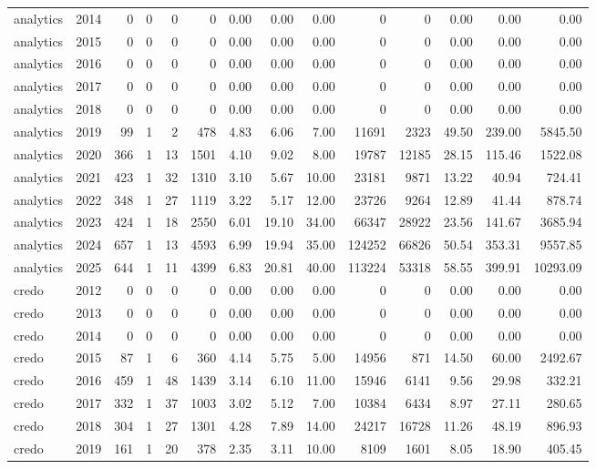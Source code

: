 \begin{table}[htbp]
\begin{tabular}{lrrrrrrrrrrrrr}
analytics & 2014 & 0 & 0 & 0 & 0 & 0.00 & 0.00 & 0.00 & 0 & 0 & 0.00 & 0.00 & 0.00 \\
analytics & 2015 & 0 & 0 & 0 & 0 & 0.00 & 0.00 & 0.00 & 0 & 0 & 0.00 & 0.00 & 0.00 \\
analytics & 2016 & 0 & 0 & 0 & 0 & 0.00 & 0.00 & 0.00 & 0 & 0 & 0.00 & 0.00 & 0.00 \\
analytics & 2017 & 0 & 0 & 0 & 0 & 0.00 & 0.00 & 0.00 & 0 & 0 & 0.00 & 0.00 & 0.00 \\
analytics & 2018 & 0 & 0 & 0 & 0 & 0.00 & 0.00 & 0.00 & 0 & 0 & 0.00 & 0.00 & 0.00 \\
analytics & 2019 & 99 & 1 & 2 & 478 & 4.83 & 6.06 & 7.00 & 11691 & 2323 & 49.50 & 239.00 & 5845.50 \\
analytics & 2020 & 366 & 1 & 13 & 1501 & 4.10 & 9.02 & 8.00 & 19787 & 12185 & 28.15 & 115.46 & 1522.08 \\
analytics & 2021 & 423 & 1 & 32 & 1310 & 3.10 & 5.67 & 10.00 & 23181 & 9871 & 13.22 & 40.94 & 724.41 \\
analytics & 2022 & 348 & 1 & 27 & 1119 & 3.22 & 5.17 & 12.00 & 23726 & 9264 & 12.89 & 41.44 & 878.74 \\
analytics & 2023 & 424 & 1 & 18 & 2550 & 6.01 & 19.10 & 34.00 & 66347 & 28922 & 23.56 & 141.67 & 3685.94 \\
analytics & 2024 & 657 & 1 & 13 & 4593 & 6.99 & 19.94 & 35.00 & 124252 & 66826 & 50.54 & 353.31 & 9557.85 \\
analytics & 2025 & 644 & 1 & 11 & 4399 & 6.83 & 20.81 & 40.00 & 113224 & 53318 & 58.55 & 399.91 & 10293.09 \\
credo & 2012 & 0 & 0 & 0 & 0 & 0.00 & 0.00 & 0.00 & 0 & 0 & 0.00 & 0.00 & 0.00 \\
credo & 2013 & 0 & 0 & 0 & 0 & 0.00 & 0.00 & 0.00 & 0 & 0 & 0.00 & 0.00 & 0.00 \\
credo & 2014 & 0 & 0 & 0 & 0 & 0.00 & 0.00 & 0.00 & 0 & 0 & 0.00 & 0.00 & 0.00 \\
credo & 2015 & 87 & 1 & 6 & 360 & 4.14 & 5.75 & 5.00 & 14956 & 871 & 14.50 & 60.00 & 2492.67 \\
credo & 2016 & 459 & 1 & 48 & 1439 & 3.14 & 6.10 & 11.00 & 15946 & 6141 & 9.56 & 29.98 & 332.21 \\
credo & 2017 & 332 & 1 & 37 & 1003 & 3.02 & 5.12 & 7.00 & 10384 & 6434 & 8.97 & 27.11 & 280.65 \\
credo & 2018 & 304 & 1 & 27 & 1301 & 4.28 & 7.89 & 14.00 & 24217 & 16728 & 11.26 & 48.19 & 896.93 \\
credo & 2019 & 161 & 1 & 20 & 378 & 2.35 & 3.11 & 10.00 & 8109 & 1601 & 8.05 & 18.90 & 405.45 \\

\end{tabular}
\end{table}
